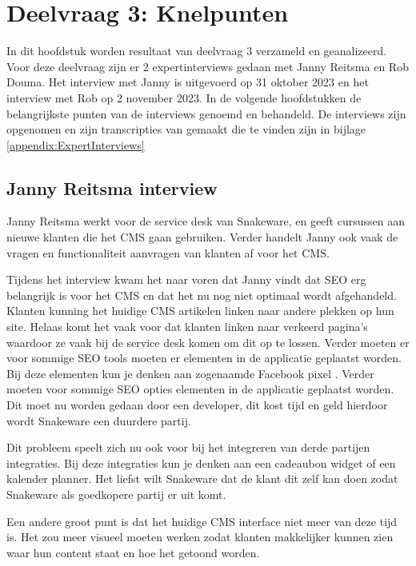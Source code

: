 \section{Deelvraag 3: Knelpunten}
In dit hoofdstuk worden resultaat van deelvraag 3 \qw{\textit{\SubquestionThree}} verzameld en geanalizeerd.
Voor deze deelvraag zijn er 2 expertinterviews gedaan met Janny Reitsma en Rob Douma.
Het interview met Janny is uitgevoerd op 31 oktober 2023 en het interview met Rob op 2 november 2023.
In de volgende hoofdstukken de belangrijkste punten van de interviews genoemd en behandeld.
De interviews zijn opgenomen en zijn transcripties van gemaakt die te vinden zijn in bijlage \ref{appendix:ExpertInterviews}

\subsection{Janny Reitsma interview}
\label{sec:JannyInterview}
Janny Reitsma werkt voor de service desk van Snakeware, en geeft cursussen aan nieuwe klanten die het CMS gaan gebruiken.
Verder handelt Janny ook vaak de vragen en functionaliteit aanvragen van klanten af voor het CMS.

\whitespace
Tijdens het interview kwam het naar voren dat Janny vindt dat \gls{SEO} erg belangrijk is voor het CMS en dat het nu nog niet optimaal wordt afgehandeld.
Klanten kunning het huidige CMS artikelen linken naar andere plekken op hun site.
Helaas komt het vaak voor dat klanten linken naar verkeerd pagina's waardoor ze vaak bij de service desk komen om dit op te lossen.
Verder moeten er voor sommige \gls{SEO} tools moeten er elementen in de applicatie geplaatst worden.
Bij deze elementen kun je denken aan zogenaamde Facebook pixel \Parencite{FacebookPixel}.
Verder moeten voor sommige \gls{SEO} opties elementen in de applicatie geplaatst worden.
Dit moet nu worden gedaan door een developer, dit kost tijd en geld hierdoor wordt Snakeware een duurdere partij.

\whitespace
Dit probleem speelt zich nu ook voor bij het integreren van derde partijen integraties.
Bij deze integraties kun je denken aan een cadeaubon widget of een kalender planner.
Het liefst wilt Snakeware dat de klant dit zelf kan doen zodat Snakeware als goedkopere partij er uit komt.

\whitespace
Een andere groot punt is dat het huidige CMS interface niet meer van deze tijd is.
Het zou meer visueel moeten werken zodat klanten makkelijker kunnen zien waar hun content staat en hoe het getoond worden.

